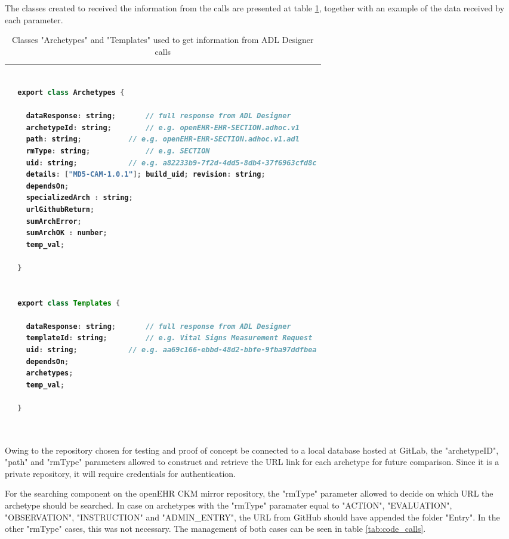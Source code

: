 \documentclass[mim_thesis.tex]{subfiles}
\begin{document}
 The classes created to received the information from the calls are presented at table \ref{tab:adl_designer_calls}, together with an example of the data received by each parameter.

\begin{table}[H]
\caption{Classes "Archetypes" and "Templates" used to get information from ADL Designer calls}
\label{tab:adl_designer_calls}
\centering
\begin{tabular}{l}
\toprule[2pt]
\begin{lstlisting}[language=java]
  
  export class Archetypes {
  
    dataResponse: string;  		// full response from ADL Designer
    archetypeId: string; 	 	// e.g. openEHR-EHR-SECTION.adhoc.v1
    path: string; 			// e.g. openEHR-EHR-SECTION.adhoc.v1.adl
    rmType: string; 			// e.g. SECTION
    uid: string; 			// e.g. a82233b9-7f2d-4dd5-8db4-37f6963cfd8c
    details: ["MD5-CAM-1.0.1"]; build_uid; revision: string;
    dependsOn;
    specializedArch : string;
    urlGithubReturn;
    sumArchError;
    sumArchOK : number;
    temp_val;
    
  }


  export class Templates {
  
    dataResponse: string;  		// full response from ADL Designer
    templateId: string;  		// e.g. Vital Signs Measurement Request
    uid: string; 			// e.g. aa69c166-ebbd-48d2-bbfe-9fba97ddfbea
    dependsOn;
    archetypes;
    temp_val;
    
  }
  
\end{lstlisting}
\tabularnewline \bottomrule[2pt]
\end{tabular}
\end{table}

Owing to the repository chosen for testing and proof of concept be connected to a local database hosted at GitLab, the "archetypeID", "path" and "rmType" parameters allowed to construct and retrieve the URL link for each archetype for future comparison. Since it is a private repository, it will require credentials for authentication. 

For the searching component on the openEHR CKM mirror repository, the "rmType" parameter allowed to decide on which URL the archetype should be searched. In case on archetypes with the "rmType" paramater equal to "ACTION", "EVALUATION", "OBSERVATION", "INSTRUCTION" and "ADMIN\_ENTRY", the URL from GitHub should have appended the folder "Entry". In the other "rmType" cases, this was not necessary. The management of both cases can be seen in table \ref{tab:code_calls}. 
\end{document}

